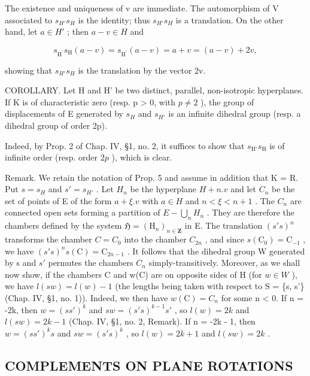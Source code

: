 The existence and uniqueness of v are immediate. The automorphism of V associated to \(s_{H'}s_{H}\) is the identity; thus \(s_{H'}s_{H}\) is a translation. On the other hand, let \(a \in H'\) ; then \(a - v \in H\) and

\[
s _ {\mathrm {H^ {\prime}}} s _ {\mathrm{H}} (a - v) = s _ {\mathrm {H^ {\prime}}} (a - v) = a + v = (a - v) + 2 v,
\]

showing that \(s_{H'}s_{H}\) is the translation by the vector 2v.

COROLLARY. Let H and H' be two distinct, parallel, non-isotropic hyperplanes. If K is of characteristic zero (resp. p \textgreater{} 0, with \(p \neq 2\) ), the group of displacements of E generated by \(s_{H}\) and \(s_{H'}\) is an infinite dihedral group (resp. a dihedral group of order 2p).

Indeed, by Prop. 2 of Chap. IV, §1, no. 2, it suffices to show that \(s_{\mathrm{H}'}s_{\mathrm{H}}\) is of infinite order (resp. order \(2p\) ), which is clear.

Remark. We retain the notation of Prop. 5 and assume in addition that K = R. Put \(s = s_{H}\) and \(s' = s_{H'}\) . Let \(H_{n}\) be the hyperplane \(H + n.v\) and let \(C_{n}\) be the set of points of E of the form \(a + \xi.v\) with \(a \in H\) and \(n < \xi < n + 1\) . The \(C_{n}\) are connected open sets forming a partition of \(E - \bigcup_{n} H_{n}\) . They are therefore the chambers defined by the system \(\mathfrak{H} = (\mathrm{H}_{n})_{n \in \mathbf{Z}}\) in E. The translation \((s's)^{n}\) transforms the chamber \(C = C_{0}\) into the chamber \(C_{2n}\) , and since \(s(\mathrm{C}_{0}) = \mathrm{C}_{-1}\) , we have \((s's)^{n}s(\mathrm{C}) = \mathrm{C}_{2n-1}\) . It follows that the dihedral group W generated by s and \(s'\) permutes the chambers \(C_{n}\) simply-transitively. Moreover, as we shall now show, if the chambers C and w(C) are on opposite sides of H (for \(w \in W\) ), we have \(l(sw) = l(w) - 1\) (the lengths being taken with respect to S = \{s, s'\} (Chap. IV, §1, no. 1)). Indeed, we then have \(w(\mathrm{C}) = C_{n}\) for some n \textless{} 0. If n = -2k, then \(w = (ss')^{k}\) and \(sw = (s's)^{k-1}s'\) , so \(l(w) = 2k\) and \(l(sw) = 2k - 1\) (Chap. IV, §1, no. 2, Remark). If n = -2k - 1, then \(w = (ss')^{k}s\) and \(sw = (s's)^{k}\) , so \(l(w) = 2k + 1\) and \(l(sw) = 2k\) .

\subsection{COMPLEMENTS ON PLANE ROTATIONS}

